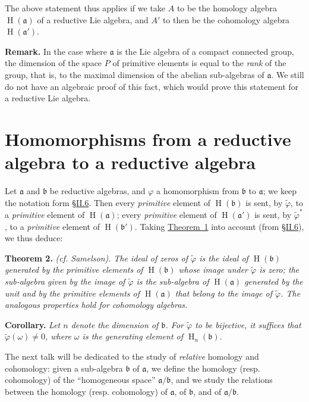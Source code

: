 \documentclass{article}
\newcommand{\fk}{\mathfrak}
\DeclareMathOperator{\HH}{H}
\newcommand{\oldpage}[1]{\marginpar{\footnotesize$\Big\vert$ \textit{p.~#1}}}
\begin{document}
The above statement thus applies if we take $A$ to be the homology algebra $\HH(\fk{a})$ of a reductive Lie algebra, and $A'$ to then be the cohomology algebra $\HH(\fk{a}')$.

\medskip
\textbf{Remark.}
In the case where $\fk{a}$ is the Lie algebra of a compact connected group, the dimension of the space $P$ of primitive elements is equal to the \emph{rank} of the group, that is, to the maximal dimension of the abelian sub-algebras of $\fk{a}$.
We still do not have an algebraic proof of this fact, which would prove this statement for a reductive Lie algebra.


\section{Homomorphisms from a reductive algebra to a reductive algebra}
\label{II.8}

Let $\fk{a}$ and $\fk{b}$ be reductive algebras, and $\varphi$ a homomorphism from $\fk{b}$ to $\fk{a}$;
we keep the notation form \hyperref[II.6]{\S II.6}.
Then every \emph{primitive} element of $\HH(\fk{b})$ is sent, by $\widetilde{\varphi}$, to a \emph{primitive} element of $\HH(\fk{a})$;
every \emph{primitive} element of $\HH(\fk{a}')$ is sent, by $\widetilde{\varphi}^*$, to a \emph{primitive} element of $\HH(\fk{b}')$.
Taking
\oldpage{52}
\hyperref[theorem1]{Theorem~1} into account (from \hyperref[II.6]{\S II.6}), we thus deduce:

\medskip
\textbf{Theorem 2.}
\emph{(cf. Samelson).}
{\itshape
  The ideal of zeros of $\widetilde{\varphi}$ is the \emph{ideal} of $\HH(\fk{b})$ generated by the \emph{primitive} elements of $\HH(\fk{b})$ whose image under $\widetilde{\varphi}$ is zero;
  the sub-algebra given by the image of $\widetilde{\varphi}$ is the \emph{sub-algebra} of $\HH(\fk{a})$ generated by the unit and by the \emph{primitive} elements of $\HH(\fk{a})$ that belong to the image of $\widetilde{\varphi}$.
  The analogous properties hold for cohomology algebras.
}

\medskip
\textbf{Corollary.}
{\itshape
  Let $n$ denote the dimension of $\fk{b}$.
  For $\widetilde{\varphi}$ to be \emph{bijective}, it suffices that $\widetilde{\varphi}(\omega)\neq0$, where $\omega$ is the generating element of $\HH_n(\fk{b})$.
}

\medskip
The next talk will be dedicated to the study of \emph{relative} homology and cohomology:
given a sub-algebra $\fk{b}$ of $\fk{a}$, we define the homology (resp. cohomology) of the ``homogeneous space'' $\fk{a}/\fk{b}$, and we study the relations between the homology (resp. cohomology) of $\fk{a}$, of $\fk{b}$, and of $\fk{a}/\fk{b}$.
\end{document}
